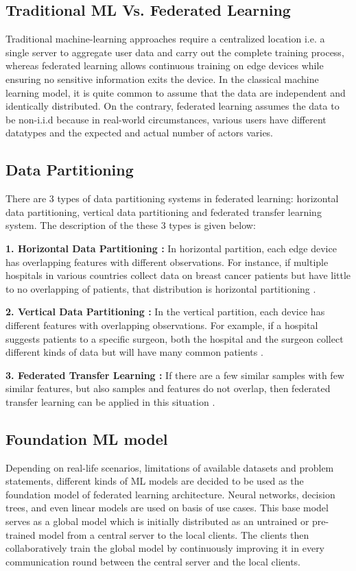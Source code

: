 \subsection{Traditional ML Vs. Federated Learning}
Traditional machine-learning approaches require a centralized location i.e. a single server to aggregate user data and carry out the complete training process, whereas federated learning allows continuous training on edge devices while ensuring no sensitive information exits the device. In the classical machine learning model, it is quite common to assume that the data are independent and identically distributed. On the contrary, federated learning assumes the data to be non-i.i.d because in real-world circumstances, various users have different datatypes and the expected and actual number of actors varies.

\subsection{Data Partitioning}
There are 3 types of data partitioning systems in federated learning: horizontal data partitioning, vertical data partitioning and federated transfer learning system. The description of the these 3 types is given below:

\textbf{1. Horizontal Data Partitioning :}
In horizontal partition, each edge device has overlapping features with different observations. For instance, if multiple hospitals in various countries collect data on breast cancer patients but have little to no overlapping of patients, that distribution is horizontal partitioning \cite{ar17}. 
		
\textbf{2. Vertical Data Partitioning :}
In the vertical partition, each device has different features with overlapping observations. For example, if a hospital suggests patients to a specific surgeon, both the hospital and the surgeon collect different kinds of data but will have many common patients \cite{ar17}.

\textbf{3. Federated Transfer Learning :}
If there are a few similar samples with few similar features, but also samples and features do not overlap, then federated transfer learning can be applied in this situation \cite{ar17}.

\subsection{Foundation ML model}
Depending on real-life scenarios, limitations of available datasets and problem statements, different kinds of ML models are decided to be used as the foundation model of federated learning architecture. Neural networks, decision trees, and even linear models are used on basis of use cases. This base model serves as a global model which is initially distributed as an untrained or pre-trained model from a central server to the local clients. The clients then collaboratively train the global model by continuously improving it in every communication round between the central server and the local clients. 

